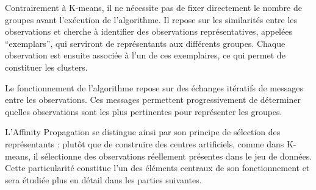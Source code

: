 \documentclass[11pt,a4paper]{memoirerecherche}
\begin{document}
Contrairement à K-means, il ne nécessite pas de fixer directement le
nombre de groupes avant l'exécution de l'algorithme. Il repose sur les
similarités entre les observations et cherche à identifier des
observations représentatives, appelées ``exemplars'', qui serviront de
représentants aux différents groupes. Chaque observation est ensuite
associée à l'un de ces exemplaires, ce qui permet de constituer les
clusters.

Le fonctionnement de l'algorithme repose sur des échanges itératifs de
messages entre les observations. Ces messages permettent progressivement
de déterminer quelles observations sont les plus pertinentes pour
représenter les groupes.

L'Affinity Propagation se distingue ainsi par son principe de sélection
des représentants : plutôt que de construire des centres artificiels,
comme dans K-means, il sélectionne des observations réellement présentes
dans le jeu de données. Cette particularité constitue l'un des éléments
centraux de son fonctionnement et sera étudiée plus en détail dans les
parties suivantes.

\printbibliography[heading=bibintoc,title={Bibliographie}]
\end{document}
